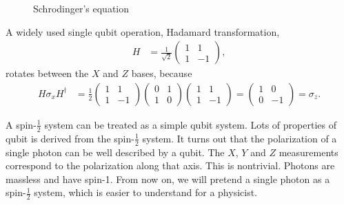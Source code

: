 \documentclass[onecolumn,pra,superscriptaddress,nofootinbib]{revtex4-1}
\begin{document}
\begin{figure}[tbh]
\centering {}
\caption{Schrodinger's equation} \label{fig:SchrodingerEq}
\end{figure}

A widely used single qubit operation, Hadamard transformation,
\begin{equation} \label{eq:Hadamard}
\begin{aligned}
H &= \frac{1}{\sqrt2}
    \begin{pmatrix}
      1&1\\
      1&-1
    \end{pmatrix},
\end{aligned}
\end{equation}
rotates between the $X$ and $Z$ bases, because
\begin{equation} \label{eq:xzHadamard}
\begin{aligned}
H\sigma_x H^\dag &= \frac{1}{2}
    \begin{pmatrix}
      1&1\\
      1&-1
    \end{pmatrix}
    \begin{pmatrix}
      0&1\\
      1&0
    \end{pmatrix}
    \begin{pmatrix}
      1&1\\
      1&-1
    \end{pmatrix}
=   \begin{pmatrix}
      1&0\\
      0&-1
    \end{pmatrix}
= \sigma_z.
\end{aligned}
\end{equation}

A spin-$\frac12$ system can be treated as a simple qubit system. Lots of properties of qubit is derived from the spin-$\frac12$ system. It turns out that the polarization of a single photon can be well described by a qubit. The $X$, $Y$ and $Z$ measurements correspond to the polarization along that axis. This is nontrivial. Photons are massless and have spin-1. From now on, we will pretend a single photon as a spin-$\frac12$ system, which is easier to understand for a physicist.
\end{document}
